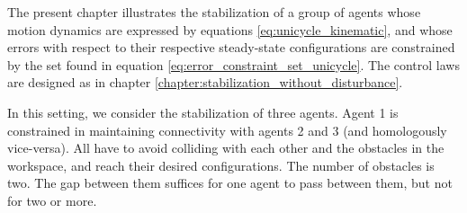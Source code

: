 The present chapter illustrates the stabilization of a group of agents whose
motion dynamics are expressed by equations \eqref{eq:unicycle_kinematic}, and
whose errors with respect to their respective steady-state configurations are
constrained by the set found in equation \eqref{eq:error_constraint_set_unicycle}.
The control laws are designed as in chapter
\ref{chapter:stabilization_without_disturbance}.

In this setting, we consider the stabilization of three agents. Agent 1
is constrained in maintaining connectivity with agents 2 and 3 (and
homologously vice-versa). All have to avoid colliding with each other
and the obstacles in the workspace, and reach their desired configurations.
The number of obstacles is two. The gap between them suffices for one
agent to pass between them, but not for two or more.
